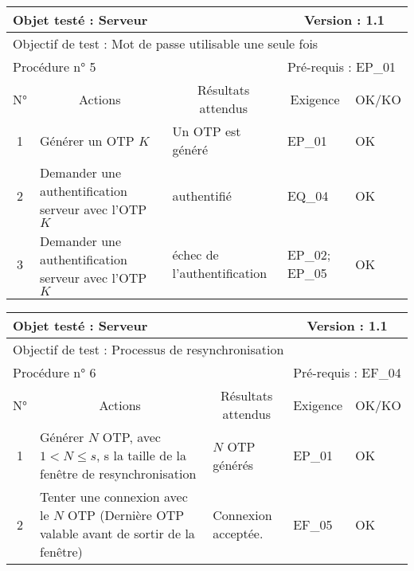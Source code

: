\documentclass{"../../res/univ-projet"}
\begin{document}
\begin{center}
    \begin{tabular}{|c|p{5cm}|p{5cm}|p{1.5cm}|p{1.5cm}|}
      \hline
      \multicolumn{3}{|l|}{Objet testé : Serveur} & \multicolumn{2}{c|}{Version : 1.1}\\ \hline
      \multicolumn{5}{|l|}{Objectif de test : Mot de passe utilisable une seule fois}\\ \hline
      \multicolumn{3}{|l|}{Procédure n° 5} & \multicolumn{2}{p{3cm}|}{Pré-requis : EP\_01}\\ \hline
      \multicolumn{1}{|c|}{N°} & \multicolumn{1}{c|}{Actions} & \multicolumn{1}{c|}{Résultats attendus} & 
      \multicolumn{1}{c|}{Exigence} & \multicolumn{1}{c|}{OK/KO}\\ \hline
      1 & Générer un OTP $K$& Un OTP est généré & EP\_01 & OK \\
      2 & Demander une authentification serveur avec l'OTP $K$ & authentifié & EQ\_04 & OK\\
      3 & Demander une authentification serveur avec l'OTP $K$ & échec de l'authentification & EP\_02; EP\_05 & OK\\ \hline
    \end{tabular}
    \vskip 2.5cm
    \begin{tabular}{|c|p{5cm}|p{5cm}|p{1.5cm}|p{1.5cm}|}
      \hline
      \multicolumn{3}{|l|}{Objet testé : Serveur} & \multicolumn{2}{c|}{Version : 1.1}\\ \hline
      \multicolumn{5}{|l|}{Objectif de test : Processus de resynchronisation}\\ \hline
      \multicolumn{3}{|l|}{Procédure n° 6} & \multicolumn{2}{p{3cm}|}{Pré-requis : EF\_04 }\\ \hline
      \multicolumn{1}{|c|}{N°} & \multicolumn{1}{c|}{Actions} & \multicolumn{1}{c|}{Résultats attendus} & 
      \multicolumn{1}{c|}{Exigence} & \multicolumn{1}{c|}{OK/KO}\\ \hline
      1 & Générer $N$ OTP, avec $1 < N \leq{} s$, s la taille de la fenêtre de resynchronisation& $N$ OTP générés & EP\_01 & OK \\
      2 & Tenter une connexion avec le $N$\up{ième} OTP (Dernière OTP valable avant de sortir de la fenêtre) & Connexion acceptée. & EF\_05 & OK \\ \hline      
    \end{tabular} 

\end{center}
\end{document}
